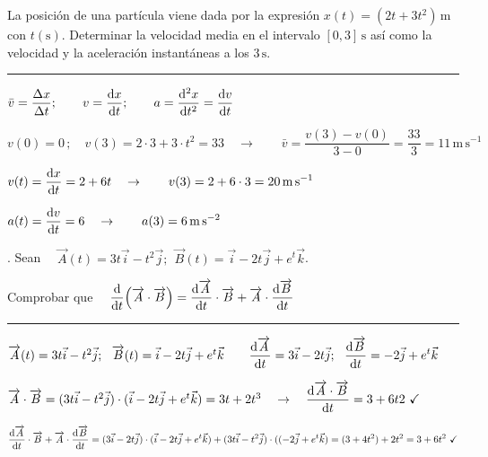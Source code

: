 \vspace{1cm}
\begin{miejercicio}
		\textsf{La posición de una partícula viene dada por la expresión $x(t)=(2t+3t^2)\, \mathrm{m}$	 con $t(\mathrm{s})$. Determinar la velocidad media en el intervalo $[0,3]\, \mathrm{s}$ así como la velocidad  y la aceleración instantáneas a los $3\, \mathrm{s}$.}


\color{teal!80}
\rule{200pt}{0.2pt}

\vspace{5mm}
\color{black}

$\displaystyle \bar v=\dfrac{\Delta x}{\Delta t};\qquad v=\dv{x}{t};\qquad a=\dv[2]{x}{t}=\dv{v}{t} $

\vspace{2mm}$v(0)=0\, ;\quad v(3)=2\cdot 3+3\cdot t^2=33 \quad \to \qquad \bar v=\dfrac{v(3)-v(0)}{3-0}=\dfrac {33}3=11\, \mathrm{m\, s}^{-1}$

\vspace{2mm}$v(t)=\displaystyle \dv{x}{t}=2+6t \quad \to \qquad v(3)=2+6\cdot 3=20 \,  \mathrm{m\, s}^{-1}$

\vspace{2mm}$a(t)=\displaystyle \dv{v}{t}=6 \quad \to \qquad a(3)=6\,  \mathrm{m}\,\mathrm{s}^{-2}$

\end{miejercicio}

\vspace{1cm}
\begin{miejercicio}
.	Sean $\quad \overrightarrow A(t)=3t\vec i-t^2\vec j;\ \ \overrightarrow B(t)=\vec i-2t\vec j+e^t\vec k$. 

\vspace{3mm} Comprobar que $\quad \displaystyle \dv{t} (\overrightarrow A \cdot \overrightarrow B)= \dv{\overrightarrow A}{t} \cdot \overrightarrow B + \overrightarrow A \cdot \dv{\overrightarrow B}{t}$

\color{teal!80}
\rule{200pt}{0.2pt}
\color{black}
\vspace{5mm}

 $\overrightarrow A(t)=3t\vec i-t^2\vec j;\ \ \overrightarrow B(t)=\vec i-2t\vec j+e^t\vec k \qquad \displaystyle \dv{\overrightarrow A}{t}=3\vec i-2t\vec j; \ \ \dv{\overrightarrow B}{t}=-2\vec j+e^t\vec k$ 	
 
 $\overrightarrow A \cdot \overrightarrow B=(3t\vec i-t^2\vec j)\cdot(\vec i-2t\vec j+e^t\vec k)=3t+2t^3 \quad \to \quad \displaystyle \dv{\overrightarrow A \cdot \overrightarrow B}{t}=3+6t2 \ \checkmark$
 
 $\displaystyle \dv{\overrightarrow A}{t} \cdot \overrightarrow B + \overrightarrow A \cdot \dv{\overrightarrow B}{t} = (3\vec i -2t \vec j)\cdot(\vec i-2t\vec j+e^t\vec k)+(3t\vec i-t^2\vec j)\cdot((-2\vec j+e^t\vec k)=(3+4t^2)+2t^2=3+6t^2 \ \checkmark$

\end{miejercicio}


